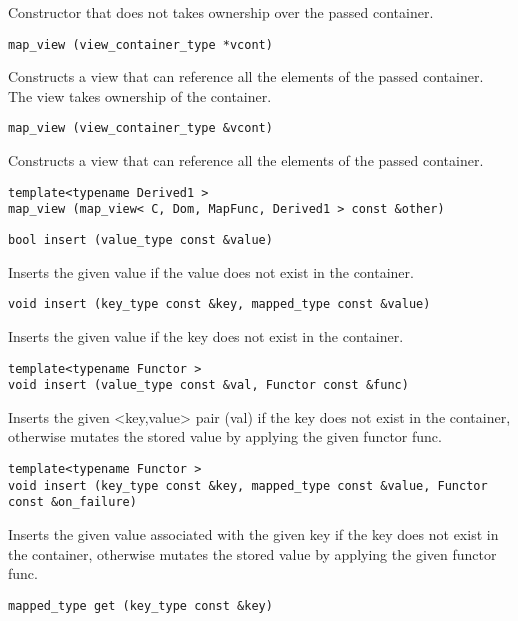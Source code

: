 Constructor that does not takes ownership over the passed container.

\begin{verbatim}
map_view (view_container_type *vcont)
\end{verbatim}

Constructs a view that can reference all the elements of the passed container. The view takes ownership of the container.

\begin{verbatim}
map_view (view_container_type &vcont)
\end{verbatim}

Constructs a view that can reference all the elements of the passed container.

\begin{verbatim}
template<typename Derived1 >
map_view (map_view< C, Dom, MapFunc, Derived1 > const &other)
\end{verbatim}

\begin{verbatim}
bool insert (value_type const &value)
\end{verbatim}

Inserts the given value if the value does not exist in the container.

\begin{verbatim}
void insert (key_type const &key, mapped_type const &value)
\end{verbatim}

Inserts the given value if the key does not exist in the container.

\begin{verbatim}
template<typename Functor >
void insert (value_type const &val, Functor const &func)
\end{verbatim}

Inserts the given <key,value> pair (val) if the key does not exist in the container, otherwise mutates the stored value by applying the given functor func.

\begin{verbatim}
template<typename Functor >
void insert (key_type const &key, mapped_type const &value, Functor const &on_failure)
\end{verbatim}

Inserts the given value associated with the given key if the key does not exist in the container, otherwise mutates the stored value by applying the given functor func.

\begin{verbatim}
mapped_type get (key_type const &key)
\end{verbatim}

